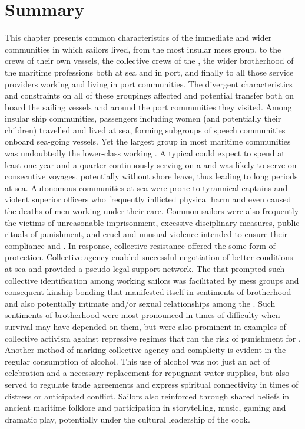 \section{{Summary}}\label{sec:4.4}

This chapter presents common characteristics of the immediate and wider communities in which sailors lived, from the most insular mess group, to the crews of their own vessels, the collective crews of the , the wider brotherhood of the maritime professions both at sea and in port, and finally to all those service providers working and living in port communities. The divergent characteristics and constraints on all of these groupings affected  and potential transfer both on board the sailing vessels and around the port communities they visited. Among insular ship communities, passengers including women (and potentially their children) travelled and lived at sea, forming subgroups of speech communities onboard sea-going vessels. Yet the largest group in most maritime communities was undoubtedly the lower-class working . A typical  could expect to spend at least one year and a quarter continuously serving on a   and was likely to serve on consecutive voyages, potentially without shore leave, thus leading to long periods at sea. Autonomous communities at sea were prone to tyrannical captains and violent superior officers who frequently inflicted physical harm and even caused the deaths of men working under their care. Common sailors were also frequently the victims of unreasonable imprisonment, excessive disciplinary measures, public rituals of punishment, and cruel and unusual violence intended to ensure their compliance and . In response, collective resistance offered the  some form of protection. Collective agency enabled successful negotiation of better conditions at sea and provided a pseudo-legal support network. The  that prompted such collective identification among working sailors was facilitated by mess groups and consequent kinship bonding that manifested itself in sentiments of brotherhood and also potentially intimate and/or sexual relationships among the . Such sentiments of brotherhood were most pronounced in times of difficulty when survival may have depended on them, but were also prominent in examples of collective activism against repressive regimes that ran the risk of punishment for . Another method of marking collective agency and complicity is evident in the regular consumption of alcohol. This use of alcohol was not just an act of celebration and a necessary replacement for repugnant water supplies, but also served to regulate trade agreements and express spiritual connectivity in times of distress or anticipated conflict. Sailors also reinforced  through shared beliefs in ancient maritime folklore and participation in storytelling, music, gaming and dramatic play, potentially under the cultural leadership of the cook. 

